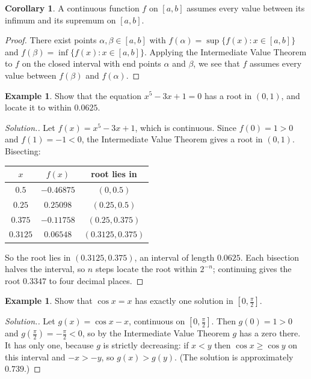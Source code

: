 \documentclass[11pt,a4paper]{article}
\numberwithin{equation}{section}
\theoremstyle{definition}
\newtheorem{exa}[thm]{Example}
\newtheorem{coro}[thm]{Corollary}
\newenvironment{solution}
  {\renewcommand{\qedsymbol}{}\begin{proof}[\textit{Solution}.]}
  {\end{proof}}
\begin{document}
\begin{coro}
A continuous function $f$ on $[a,b]$ assumes every value between its infimum and its supremum on $[a,b]$.
\end{coro}

\begin{proof}
There exist points $\alpha, \beta \in [a,b]$ with $f(\alpha) = \sup\{f(x): x\in [a,b]\}$ and $f(\beta) = \inf \{f(x): x \in [a,b]\}$. Applying the Intermediate Value Theorem to $f$ on the closed interval with end points $\alpha$ and $\beta$, we see that $f$ assumes every value between $f(\beta)$ and $f(\alpha)$.
\end{proof}

\begin{exa}
Show that the equation $x^5 - 3x + 1 = 0$ has a root in $(0,1)$, and locate it to within $0.0625$.
\end{exa}

\begin{solution}
Let $f(x) = x^5-3x+1$, which is continuous. Since $f(0) = 1>0$ and $f(1) = -1<0$, the Intermediate Value Theorem gives a root in $(0,1)$. Bisecting:
\begin{center}
\begin{tabular}{ccc}
$x$ & $f(x)$ & root lies in\\ \hline
$0.5$ & $-0.46875$ & $(0,0.5)$\\
$0.25$ & $0.25098$ & $(0.25,0.5)$\\
$0.375$ & $-0.11758$ & $(0.25,0.375)$\\
$0.3125$ & $0.06548$ & $(0.3125,0.375)$
\end{tabular}
\end{center}
So the root lies in $(0.3125,0.375)$, an interval of length $0.0625$. Each bisection halves the interval, so $n$ steps locate the root within $2^{-n}$; continuing gives the root $0.3347$ to four decimal places.
\end{solution}

\begin{exa}
Show that $\cos x = x$ has exactly one solution in $\left[0,\frac{\pi}{2}\right]$.
\end{exa}

\begin{solution}
Let $g(x) = \cos x - x$, continuous on $\left[0,\frac{\pi}{2}\right]$. Then $g(0) = 1>0$ and $g\left(\frac{\pi}{2}\right) = -\frac{\pi}{2}<0$, so by the Intermediate Value Theorem $g$ has a zero there. It has only one, because $g$ is strictly decreasing: if $x<y$ then $\cos x\geq\cos y$ on this interval and $-x>-y$, so $g(x)>g(y)$. (The solution is approximately $0.739$.)
\end{solution}
\end{document}
